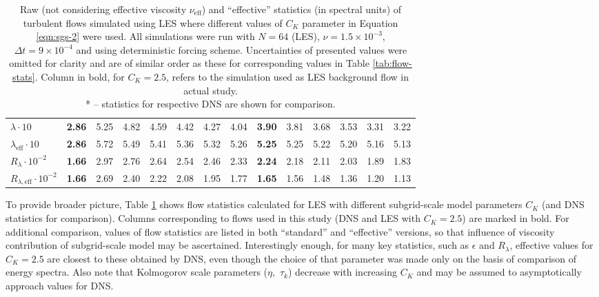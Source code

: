 \documentclass{pracamgren}
\begin{document}
\begin{table}[h]
\begin{tabular}{llllllllllllll}
$\lambda \cdot 10$ & \textbf{2.86} & 5.25 & 4.82 & 4.59 & 4.42 & 4.27 & 4.04 & \textbf{3.90} & 3.81 & 3.68 & 3.53 & 3.31 & 3.22 \\
$\lambda_{\text{eff}} \cdot 10$ & \textbf{2.86} & 5.72 & 5.49 & 5.41 & 5.36 & 5.32 & 5.26 & \textbf{5.25} & 5.25 & 5.22 & 5.20 & 5.16 & 5.13 \\
$R_{\lambda} \cdot 10^{-2}$ & \textbf{1.66} & 2.97 & 2.76 & 2.64 & 2.54 & 2.46 & 2.33 & \textbf{2.24} & 2.18 & 2.11 & 2.03 & 1.89 & 1.83 \\
$R_{\lambda, \text{eff}} \cdot 10^{-2}$ & \textbf{1.66} & 2.69 & 2.40 & 2.22 & 2.08 & 1.95 & 1.77 & \textbf{1.65} & 1.56 & 1.48 & 1.36 & 1.20 & 1.13 \\ \hline
\end{tabular}
\caption{Raw (not considering effective viscosity $\nu_{\text{eff}}$) and ``effective'' statistics (in spectral units) of turbulent flows simulated using LES where different values of $C_K$ parameter in Equation \ref{eqn:sgs-2} were used. 
All simulations were run with $N=64$ (LES), $\nu = 1.5 \times 10^{-3}$, $\Delta t = 9 \times 10^{-4}$ and using deterministic forcing scheme.
Uncertainties of presented values were omitted for clarity and are of similar order as these for corresponding values in Table \ref{tab:flow-stats}.
Column in bold, for $C_K=2.5$, refers to the simulation used as LES background flow in actual study. \\
* -- statistics for respective DNS are shown for comparison.
}
\label{tab:sgs-stats}
\end{table}

To provide broader picture, Table \ref{tab:sgs-stats} shows flow statistics calculated for LES with different subgrid-scale model parameters $C_K$ (and DNS statistics for comparison).
Columns corresponding to flows used in this study (DNS and LES with $C_K=2.5$) are marked in bold.
For additional comparison, values of flow statistics are listed in both ``standard'' and ``effective'' versions, so that influence of viscosity contribution of subgrid-scale model may be ascertained.
Interestingly enough, for many key statistics, such as $\epsilon$ and $R_{\lambda}$, effective values for $C_K=2.5$ are closest to these obtained by DNS, even though the choice of that parameter was made only on the basis of comparison of energy spectra.
Also note that Kolmogorov scale parameters ($\eta$,~$\tau_k$) decrease with increasing $C_K$ and may be assumed to asymptotically approach values for DNS.
\end{document}
